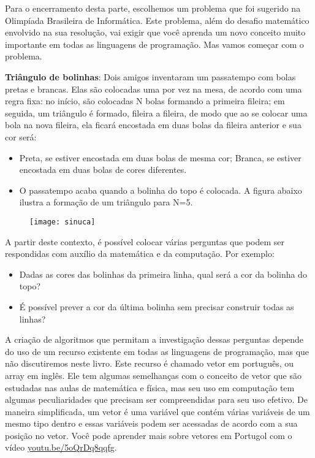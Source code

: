 Para o encerramento desta parte, escolhemos um problema que foi sugerido na Olimpíada Brasileira de Informática. Este problema, além do desafio matemático envolvido na sua resolução, vai exigir que você aprenda um novo conceito muito importante em todas as linguagens de programação. Mas vamos começar com o problema.

\textbf{Triângulo de bolinhas}: Dois amigos inventaram um passatempo com bolas pretas e brancas. Elas são colocadas uma por vez na mesa, de acordo com uma regra fixa: no início, são colocadas N bolas formando a primeira fileira; em seguida, um triângulo é formado, fileira a fileira, de modo que ao se colocar uma bola na nova fileira, ela ficará encostada em duas bolas da fileira anterior e sua cor será:

\begin{itemize}
\item Preta, se estiver encostada em duas bolas de mesma cor;
Branca, se estiver encostada em duas bolas de cores diferentes.

\item O passatempo acaba quando a bolinha do topo é colocada. A figura abaixo ilustra a formação de um triângulo para N=5.
\end{itemize}

\begin{figure}[H]
\centering

\texttt{[image: sinuca]}
\end{figure}

A partir deste contexto, é possível colocar várias perguntas que podem ser respondidas com auxílio da matemática e da computação. Por exemplo:

\begin{itemize}
\item Dadas as cores das bolinhas da primeira linha, qual será a cor da bolinha do topo?
\item É possível prever a cor da última bolinha sem precisar construir todas as linhas?
\end{itemize}
A criação de algoritmos que permitam a investigação dessas perguntas depende do uso de um recurso existente em todas as linguagens de programação, mas que não discutiremos neste livro. Este recurso é chamado vetor em português, ou array em inglês. Ele tem algumas semelhanças com o conceito de vetor que são estudadas nas aulas de matemática e física, mas seu uso em computação tem algumas peculiaridades que precisam ser compreendidas para seu uso efetivo. De maneira simplificada, um vetor é uma variável que contém várias variáveis de um mesmo tipo dentro e essas variáveis podem ser acessadas de acordo com a sua posição no vetor. Você pode aprender mais sobre vetores em Portugol com o vídeo \url{youtu.be/5oQrDq8qqfg}.

